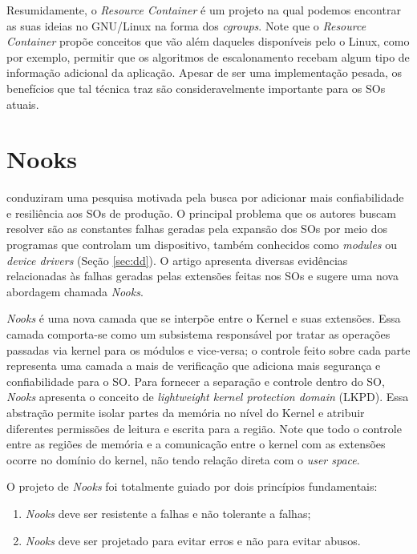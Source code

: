 Resumidamente, o \emph{Resource Container} é um projeto na qual podemos
encontrar as suas ideias no GNU/Linux na forma dos \emph{cgroups}. Note que o
\emph{Resource Container} propõe conceitos que vão além daqueles disponíveis
pelo o Linux, como por exemplo, permitir que os algoritmos de escalonamento
recebam algum tipo de informação adicional da aplicação. Apesar de ser uma
implementação pesada, os benefícios que tal técnica traz são consideravelmente
importante para os SOs atuais.

\section{Nooks}
\citet{nooks} conduziram uma pesquisa motivada pela busca por
adicionar mais confiabilidade e resiliência aos SOs de produção. O principal
problema que os autores buscam resolver são as constantes falhas geradas pela
expansão dos SOs por meio dos programas que controlam um dispositivo, também
conhecidos como \emph{modules} ou \emph{device drivers} (Seção \ref{sec:dd}). O
artigo apresenta diversas evidências relacionadas às falhas geradas
pelas extensões feitas nos SOs e sugere uma nova abordagem chamada
\emph{Nooks}.

\emph{Nooks} é uma nova camada que se interpõe entre o Kernel e suas extensões.
Essa camada comporta-se como um subsistema responsável por tratar as operações
passadas via kernel para os módulos e vice-versa; o controle feito sobre cada
parte representa uma camada a mais de verificação que adiciona mais segurança e
confiabilidade para o SO. Para fornecer a separação e controle dentro do SO,
\emph{Nooks} apresenta o conceito de \emph{lightweight kernel protection
domain} (LKPD). Essa abstração permite isolar partes da memória no nível do
Kernel e atribuir diferentes permissões de leitura e escrita para a região.
Note que todo o controle entre as regiões de memória e a comunicação entre o
kernel com as extensões ocorre no domínio do kernel, não tendo relação direta
com o \emph{user space}.

O projeto de \emph{Nooks} foi totalmente guiado por dois princípios
fundamentais:

\begin{enumerate}
	\item \emph{Nooks} deve ser resistente a falhas e não tolerante a falhas;
	\item \emph{Nooks} deve ser projetado para evitar erros e não para evitar
				abusos.
\end{enumerate}


